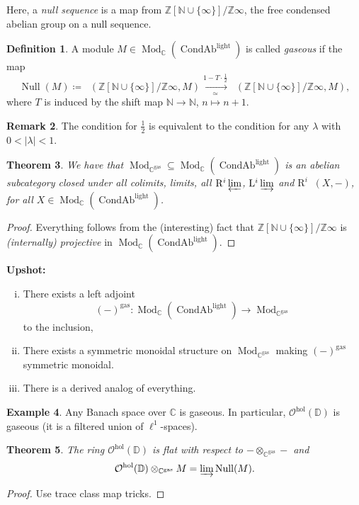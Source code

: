 \documentclass[draft]{amsart}
\newcommand{\NN}{\mathbb{N}}
\newcommand{\ZZ}{\mathbb{Z}}
\newcommand{\DD}{\mathbb{D}}
\newcommand{\CC}{\mathbb{C}}
\newcommand{\R}{\mathrm{R}}
\renewcommand{\L}{\mathrm{L}}
\renewcommand{\O}{\mathcal{O}}
\newcommand{\ul}[1]{\underline{#1}}
\newcommand{\blank}{-} %
\DeclareMathOperator{\Null}{Null}
\DeclareMathOperator{\CondAb}{CondAb}
\DeclareMathOperator{\iHom}{\ul{Hom}}
\DeclareMathOperator{\Mod}{Mod}
\newtheorem{thm}{Theorem}[section]
\theoremstyle{definition}
\newtheorem{defn}[thm]{Definition}
\newtheorem{rem}[thm]{Remark}
\newtheorem{ex}[thm]{Example}
\begin{document}
Here, a \emph{null sequence} is a map from $\ZZ[\NN\cup \{\infty\}]/\ZZ\infty$, the free condensed abelian group on a null sequence.

\begin{defn}
A module $M\in \Mod_{\CC}(\CondAb^{\mathrm{light}})$ is called \emph{gaseous} if the map
\[
\Null(M)\coloneqq \iHom(\ZZ[\NN\cup\{\infty\}]/\ZZ\infty, M) \xrightarrow[\simeq]{1-T\cdot \frac12} \iHom(\ZZ[\NN\cup\{\infty\}]/\ZZ\infty, M),
\]
where $T$ is induced by the shift map $\NN\to \NN$, $n\mapsto n+1$.
\end{defn}

\begin{rem}
The condition for $\frac12$ is equivalent to the condition for any $\lambda$ with $0< \lvert\lambda\rvert < 1$.
\end{rem}

\begin{thm}
We have that $\Mod_{\CC^{\mathrm{gas}}} \subseteq \Mod_{\CC}(\CondAb^{\mathrm{light}})$ is an abelian subcategory closed under all colimits, limits, all $\R^i\varprojlim$, $\L^i\varinjlim$ and $\R^i\iHom(X,\blank)$, for all $X\in \Mod_{\CC}(\CondAb^{\mathrm{light}})$.
\end{thm}
\begin{proof}
Everything follows from the (interesting) fact that $\ZZ[\NN\cup\{\infty\}]/\ZZ\infty$ is \emph{(internally) projective} in $\Mod_{\CC}(\CondAb^{\mathrm{light}})$.
\end{proof}

\textbf{Upshot:} 
\begin{enumerate}[(i)]
\item There exists a left adjoint 
\[
(\blank)^{\mathrm{gas}}\colon \Mod_{\CC}(\CondAb^{\mathrm{light}}) \to \Mod_{\CC^{\mathrm{gas}}}
\]
to the inclusion,
\item There exists a symmetric monoidal structure on $\Mod_{\CC^{\mathrm{gas}}}$ making $(\blank)^{\mathrm{gas}}$ symmetric monoidal.

\item There is a derived analog of everything.
\end{enumerate}

\begin{ex}
Any Banach space over $\CC$ is gaseous. In particular, $\O^{\mathrm{hol}}(\DD)$ is gaseous (it is a filtered union of $\ell^1$-spaces).
\end{ex}

\begin{thm}
The ring $\O^{\mathrm{hol}}(\DD)$ is flat with respect to $\blank\otimes_{\CC^{\mathrm{gas}}}\blank$ and
\[
\O^{\mathrm{hol}}(\DD) \otimes_{\CC^{\mathrm{gas}}} M = \varinjlim \Null(M).
\]
\end{thm}
\begin{proof}
Use trace class map tricks.
\end{proof}
\end{document}
